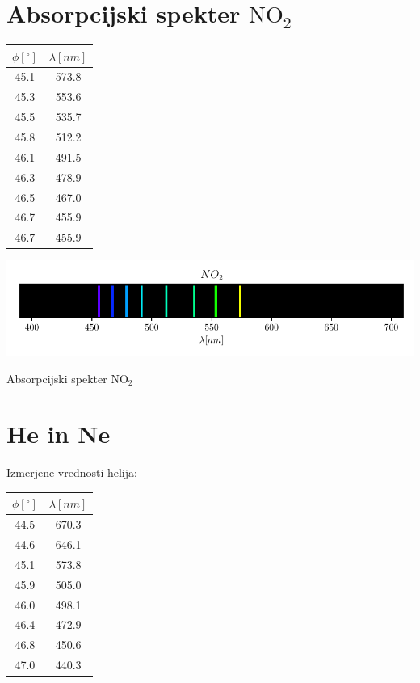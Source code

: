 \documentclass[12pt]{report}
\begin{document}
\section*{Absorpcijski spekter $\text{NO}_2$}

\begin{tabela}[H]
  \centering
  \begin{tabular}{|c|c|}\hline
    $\phi [^{\circ}]$ & $\lambda [nm]$ \\ \hline
    45.1 &   573.8\\
    45.3 &   553.6\\
    45.5 &   535.7\\
    45.8 &   512.2\\
    46.1 &   491.5\\
    46.3 &   478.9\\
    46.5 &   467.0\\
    46.7 &   455.9\\
    46.7 &   455.9 \\ \hline
  \end{tabular}
\end{tabela}

\begin{slika}[H]
  \centering
  \includegraphics{no2}
  \caption{\small Absorpcijski spekter $\text{NO}_2$}
\end{slika}

\section*{He in Ne}

Izmerjene vrednosti helija: 

\begin{tabela}[H]
  \centering
  \begin{tabular}{|c|c|}\hline
    $\phi [^{\circ}]$ & $\lambda [nm]$ \\ \hline
    44.5 &   670.3\\
    44.6 &   646.1\\
    45.1 &   573.8\\
    45.9 &   505.0\\
    46.0 &   498.1\\
    46.4 &   472.9\\
    46.8 &   450.6\\
    47.0 &   440.3 \\ \hline
  \end{tabular}
\end{tabela}
\end{document}
